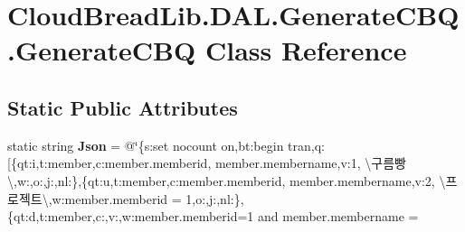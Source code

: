 \hypertarget{a00085}{}\section{Cloud\+Bread\+Lib.\+D\+A\+L.\+Generate\+C\+B\+Q.\+Generate\+C\+BQ Class Reference}
\label{a00085}
\subsection*{Static Public Attributes}
\begin{DoxyCompactItemize}
\item 
static string {\bfseries Json} = @\char`\"{}\{\textquotesingle{}s\textquotesingle{}\+:\textquotesingle{}set nocount on\textquotesingle{},\textquotesingle{}bt\textquotesingle{}\+:\textquotesingle{}begin tran\textquotesingle{},\textquotesingle{}q\textquotesingle{}\+:\mbox{[}\{\textquotesingle{}qt\textquotesingle{}\+:\textquotesingle{}i\textquotesingle{},\textquotesingle{}t\textquotesingle{}\+:\textquotesingle{}member\textquotesingle{},\textquotesingle{}c\textquotesingle{}\+:\textquotesingle{}member.\+memberid, member.\+membername\textquotesingle{},\textquotesingle{}v\textquotesingle{}\+:\textquotesingle{}1, \textbackslash{}\textquotesingle{}구름빵\textbackslash{}\textquotesingle{}\textquotesingle{},\textquotesingle{}w\textquotesingle{}\+:\textquotesingle{}\textquotesingle{},\textquotesingle{}o\textquotesingle{}\+:\textquotesingle{}\textquotesingle{},\textquotesingle{}j\textquotesingle{}\+:\textquotesingle{}\textquotesingle{},\textquotesingle{}nl\textquotesingle{}\+:\textquotesingle{}\textquotesingle{}\},\{\textquotesingle{}qt\textquotesingle{}\+:\textquotesingle{}u\textquotesingle{},\textquotesingle{}t\textquotesingle{}\+:\textquotesingle{}member\textquotesingle{},\textquotesingle{}c\textquotesingle{}\+:\textquotesingle{}member.\+memberid, member.\+membername\textquotesingle{},\textquotesingle{}v\textquotesingle{}\+:\textquotesingle{}2, \textbackslash{}\textquotesingle{}프로젝트\textbackslash{}\textquotesingle{}\textquotesingle{},\textquotesingle{}w\textquotesingle{}\+:\textquotesingle{}member.\+memberid = 1\textquotesingle{},\textquotesingle{}o\textquotesingle{}\+:\textquotesingle{}\textquotesingle{},\textquotesingle{}j\textquotesingle{}\+:\textquotesingle{}\textquotesingle{},\textquotesingle{}nl\textquotesingle{}\+:\textquotesingle{}\textquotesingle{}\},\{\textquotesingle{}qt\textquotesingle{}\+:\textquotesingle{}d\textquotesingle{},\textquotesingle{}t\textquotesingle{}\+:\textquotesingle{}member\textquotesingle{},\textquotesingle{}c\textquotesingle{}\+:\textquotesingle{}\textquotesingle{},\textquotesingle{}v\textquotesingle{}\+:\textquotesingle{}\textquotesingle{},\textquotesingle{}w\textquotesingle{}\+:\textquotesingle{}member.\+memberid=1 and member.\+membername = 
\end{DoxyCompactItemize}

